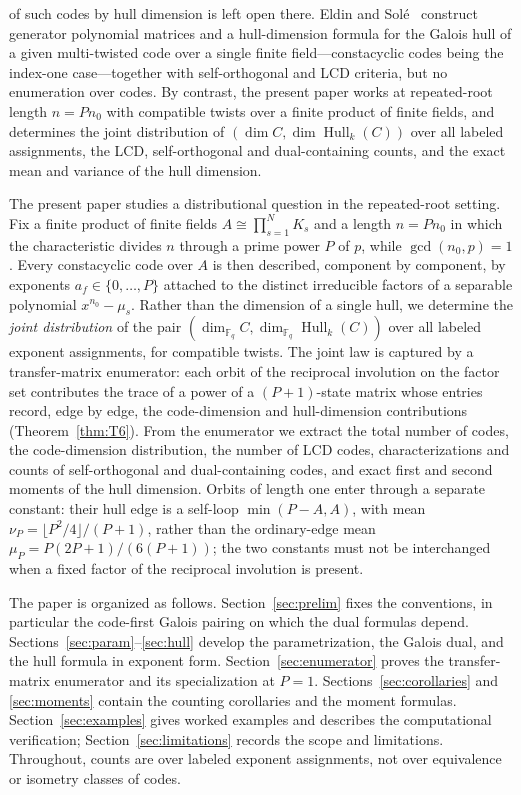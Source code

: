 \documentclass[10pt,journal,draftclsnofoot,onecolumn]{IEEEtran}
\theoremstyle{definition}
\theoremstyle{remark}
\newcommand{\Fq}{\mathbb{F}_q}
\newcommand{\Hull}{\operatorname{Hull}}
\begin{document}
of such codes by hull dimension is left open there. Eldin and
Sol\'e~\cite{ES2026} construct generator polynomial matrices and a
hull-dimension formula for the Galois hull of a given multi-twisted
code over a single finite field---constacyclic codes being the
index-one case---together with self-orthogonal and LCD criteria, but
no enumeration over codes. By contrast, the present paper works at
repeated-root length \(n = P n_0\) with compatible twists over a
finite product of finite fields, and determines the joint distribution
of \((\dim C, \dim \Hull_k(C))\) over all labeled assignments, the
LCD, self-orthogonal and dual-containing counts, and the exact mean
and variance of the hull dimension.

The present paper studies a distributional question in the repeated-root
setting. Fix a finite product of finite fields
\(A \cong \prod_{s=1}^{N} K_s\) and a length \(n = P n_0\) in which the
characteristic divides \(n\) through a prime power \(P\) of \(p\),
while \(\gcd(n_0, p) = 1\). Every constacyclic code over \(A\) is then
described, component by component, by exponents
\(a_f \in \{0, \dots, P\}\) attached to the distinct irreducible factors
of a separable polynomial \(x^{n_0} - \mu_s\). Rather than the dimension of
a single hull, we determine the \emph{joint distribution} of the pair
\((\dim_{\Fq} C, \dim_{\Fq} \Hull_k(C))\) over all labeled exponent
assignments, for compatible twists. The joint law is captured by a
transfer-matrix enumerator: each orbit of the reciprocal involution on
the factor set contributes the trace of a power of a \((P{+}1)\)-state
matrix whose entries record, edge by edge, the code-dimension and
hull-dimension contributions (Theorem~\ref{thm:T6}). From the enumerator
we extract the total number of codes, the code-dimension distribution,
the number of LCD codes, characterizations and counts of self-orthogonal
and dual-containing codes, and exact first and second moments of the hull
dimension. Orbits of length one enter through a separate constant:
their hull edge is a self-loop \(\min(P-A, A)\), with mean
\(\nu_P = \lfloor P^2/4 \rfloor / (P+1)\), rather than the ordinary-edge
mean \(\mu_P = P(2P+1)/(6(P+1))\); the two constants must not be
interchanged when a fixed factor of the reciprocal involution is
present.

The paper is organized as follows. Section~\ref{sec:prelim} fixes the
conventions, in particular the code-first Galois pairing on which the
dual formulas depend. Sections~\ref{sec:param}--\ref{sec:hull} develop
the parametrization, the Galois dual, and the hull formula in exponent
form. Section~\ref{sec:enumerator} proves the transfer-matrix enumerator
and its specialization at \(P=1\). Sections~\ref{sec:corollaries} and
\ref{sec:moments} contain the counting corollaries and the moment
formulas. Section~\ref{sec:examples} gives worked examples and describes
the computational verification; Section~\ref{sec:limitations} records
the scope and limitations. Throughout, counts are over labeled exponent
assignments, not over equivalence or isometry classes of codes.
\end{document}
